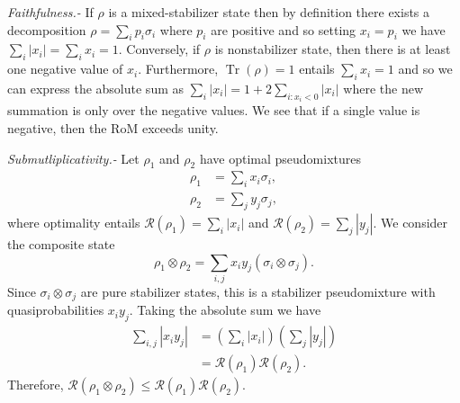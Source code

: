 \documentclass[aps,prl,twocolumn,showpacs,superscriptaddress,groupedaddress,amsmath,amssymb]{revtex4-1}  %
\DeclareMathOperator{\Tr}{Tr}
\begin{document}
\noindent\textit{Faithfulness.-} If $\rho$ is a mixed-stabilizer state then by definition there exists a decomposition $\rho = \sum_i p_i \sigma_i$ where $p_i$ are positive and so setting $x_i=p_i$ we have $\sum_i |x_i|=\sum_i x_i = 1$.  Conversely, if $\rho$ is nonstabilizer state, then there is at least one negative value of $x_i$.  Furthermore, $\Tr(\rho)=1$ entails $\sum_i x_i=1$ and so we can express the absolute sum as $\sum_i |x_i| = 1 + 2 \sum_{i :  x_i<0} | x_i|$ where the new summation is only over the negative values.  We see that if a single value is negative, then the RoM exceeds unity.

\noindent\textit{Submutliplicativity.-}  Let $\rho_1$ and $\rho_2$ have optimal pseudomixtures
\begin{align}
\label{eq:opt}
	\rho_1 & =\sum_i x_i \sigma_i ,\\ \nonumber
	\rho_2 & = \sum_j y_j \sigma_j ,
\end{align}
where optimality entails $\mathcal{R}(\rho_1)=\sum_i |x_i|$ and $\mathcal{R}(\rho_2)=\sum_j |y_j|$.  We consider the composite state
\begin{equation}
	\rho_1 \otimes \rho_2 = \sum_{i,j} x_i y_j (\sigma_i \otimes \sigma_j). 	
\end{equation}
Since $\sigma_i \otimes \sigma_j$ are pure stabilizer states, this is a stabilizer pseudomixture with quasiprobabilities  $x_i y_j$.  Taking the absolute sum we have 
\begin{align}
		\sum_{i,j} |x_i y_j | & = \left( \sum_{i} |x_i| \right) \left( \sum_{j} |y_j| \right) \\ \nonumber
	& = \mathcal{R}(\rho_1)\mathcal{R}(\rho_2).
\end{align}
Therefore, $\mathcal{R}(\rho_1 \otimes \rho_2) \leq \mathcal{R}(\rho_1)\mathcal{R}(\rho_2)$.
\end{document}
